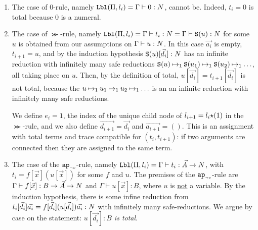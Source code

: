 \documentclass{article}
\newenvironment{proof}[1][Proof]{\begin{trivlist}
\item[\hskip \labelsep {\bfseries #1}]}{\end{trivlist}}
\begin{document}
\begin{proof}
\begin{enumerate}
\item
  The case of $0$-rule, namely ${\tt Lbl}(\Pi,l_i) = \Gamma\vdash 0:{N}$, 
cannot be. Indeed, $t_i = 0$ is total because $0$ is a numeral.


\item 
  The case of $\Succ$-rule, 
namely ${\tt Lbl}(\Pi,l_i) = \Gamma\vdash t_i: {N} = \Gamma\vdash {\tt S}(u): {N}$
  for some $u$ is obtained from our assumptions on
  $\Gamma\vdash u: {N}$. In this case $\vec{a_i}$ is empty, $t_{i+1}=u$, and
  by the induction hypothesis ${\tt S}(u)[\vec{d_i}]:{N}$ has an infinite reduction with
  infinitely many safe reductions
  ${\tt S}(u) \mathbin{\mapsto}_1  {\tt S}(u_1) \mathbin{\mapsto}_1 {\tt S}(u_2) \mathbin{\mapsto}_1 \ldots$,
  all taking place on $u$.
  Then, by the definition of total, $u[\vec{d_i}] =t_{i+1}[\vec{d_i}] $ is not total, because the
 $u \mathbin{\mapsto}_1  u_1 \mathbin{\mapsto}_1 u_2 \mathbin{\mapsto}_1 \ldots$ is an  an infinite reduction with
  infinitely many safe reductions.

  We define $e_{i}=1$, 
  the index of the unique child node of $l_{i+1}=l_i{\star}(1)$ in the $\Succ$-rule, and
  we also define $\vec{d_{i+1}} = \vec{d_i}$ and $\vec{a_{i+1}} = ()$. 
  This is an assignment with total terms and 
  trace compatible for $(t_i,t_{i+1})$: if two arguments are connected then they are assigned
  to the same term. 


\item
  The case of the ${{\tt ap}_{\mbox{\tiny $\neg v$}}}$-rule, namely 
  ${\tt Lbl}(\Pi,l_i) = \Gamma\vdash t_i: \vec{A}\rightarrow{N}$, 
  with $t_i = f[\vec{x}](u[\vec{x}])$ for some $f$ and $u$.
  The premises of the ${{\tt ap}_{\mbox{\tiny $\neg v$}}}$-rule
   are $\Gamma\vdash f[\vec{x}]: B \rightarrow \vec{A}\rightarrow{N}$ 
  and $\Gamma\vdash u[\vec{x}]: B$, where $u$ is \underline{not} a variable.
  By the induction hypothesis, there is some infine reduction from
  $t_i[\vec{d_i}]\vec{a_i} = f[\vec{d_i}](u[\vec{d_i}])\vec{a_i}:{N}$ with infinitely many safe-reductions.
  We argue by case on the statement: \emph{$u[\vec{d_i}]:B$ is total}.





\end{enumerate}
\end{proof}
\end{document}
